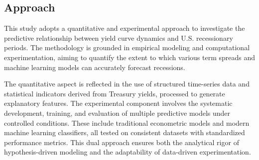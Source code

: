 \subsection{Approach}
This study adopts a quantitative and experimental approach to investigate the predictive relationship between yield curve dynamics and U.S. recessionary periods. The methodology is grounded in empirical modeling and computational experimentation, aiming to quantify the extent to which various term spreads and machine learning models can accurately forecast recessions.

The quantitative aspect is reflected in the use of structured time-series data and statistical indicators derived from Treasury yields, processed to generate explanatory features. The experimental component involves the systematic development, training, and evaluation of multiple predictive models under controlled conditions. These include traditional econometric models and modern machine learning classifiers, all tested on consistent datasets with standardized performance metrics. This dual approach ensures both the analytical rigor of hypothesis-driven modeling and the adaptability of data-driven experimentation.

